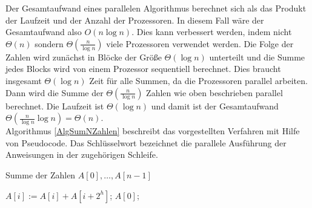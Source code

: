 Der Gesamtaufwand eines parallelen Algorithmus berechnet sich als das Produkt der Laufzeit und der Anzahl der Prozessoren. In diesem Fall wäre der Gesamtaufwand also $O(n\log n)$. Dies kann verbessert werden, indem nicht $\Theta(n)$ sondern $\Theta\left(\frac{n}{\log n}\right)$ viele Prozessoren verwendet werden. Die Folge der Zahlen wird zunächst in Blöcke der Größe $\Theta(\log n)$ unterteilt und die Summe jedes Blocks wird von einem Prozessor sequentiell berechnet. Dies braucht insgesamt $\Theta(\log n)$ Zeit für alle Summen, da die Prozessoren parallel arbeiten. Dann wird die Summe der $\Theta\left(\frac{n}{\log n}\right)$ Zahlen wie oben beschrieben parallel berechnet. Die Laufzeit ist $\Theta(\log n)$ und damit ist der Gesamtaufwand $\Theta\left(\frac{n}{\log n}\log n\right)=\Theta\left(n\right)$. \\
Algorithmus \ref{AlgSumNZahlen} beschreibt das vorgestellten Verfahren mit Hilfe von Pseudocode. Das Schlüsselwort \algpar bezeichnet die parallele Ausführung der Anweisungen in der zugehörigen Schleife.
\\
\begin{algorithm}
\caption{Summe der Zahlen $A[0],\ldots,A[n-1]$}
\label{AlgSumNZahlen}
\begin{algorithmic}[1]
\STATE $A[i]:= A[i]+A[i+2^h]$;
\ENDFOR
\ENDFOR
\RETURN $A[0]$;
\end{algorithmic}
\end{algorithm}

